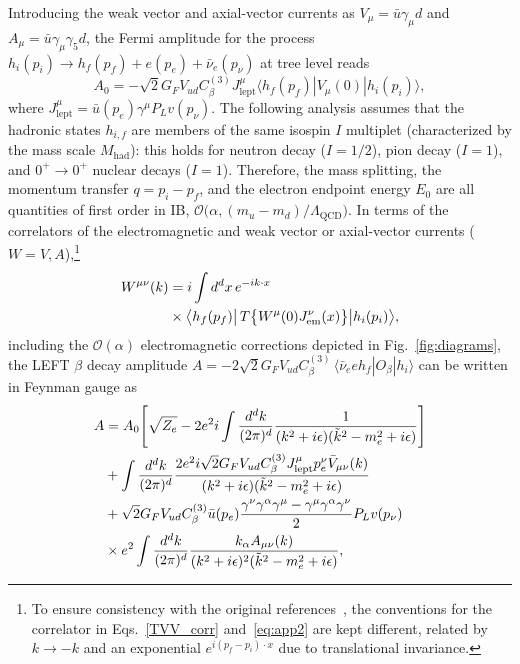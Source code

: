 \documentclass[prl,twocolumn,twoside,preprintnumbers,superscriptaddress,nofootinbib,letterpaper]{revtex4-1}
\newcommand{\Order}{\mathcal{O}}
\newcommand{\beq}{\begin{equation}}
\newcommand{\eeq}{\end{equation}}
\newcommand{\Mhad}{M_\text{had}}
\begin{document}
Introducing the weak vector and axial-vector currents as $V_\mu = \bar u \gamma_\mu d$ and $A_\mu = \bar u \gamma_\mu \gamma_5 d$,
the Fermi  amplitude  for the process
$h_i (p_i ) \to h_f (p_f) + e (p_e) + \bar \nu_e (p_\nu)$
at tree level reads
\beq
A_0 = - \sqrt{2} G_F V_{ud}
C_\beta^{(3)}
J_\text{lept}^\mu  \langle h_f (p_f) | V_\mu (0) | h_i (p_i) \rangle,
\label{eq:app1}
\eeq
where $J_\text{lept}^\mu  =  \bar u(p_e) \gamma^\mu P_L v (p_\nu)$.
The following analysis assumes that the hadronic states $h_{i,f}$ are
 members of the same isospin $I$ multiplet (characterized by the mass scale $\Mhad$):
 this holds for neutron decay ($I=1/2$),  pion decay ($I=1$), and $0^+ \to 0^+$  nuclear decays ($I=1$).
 Therefore,  the mass splitting, the  momentum transfer $q = p_i - p_f$, and
 the electron endpoint energy $E_0$ are all quantities of first order in IB,
 $\Order\big(\alpha, (m_u-m_d)/\Lambda_\text{QCD}\big)$.
In terms of the correlators   of the electromagnetic and weak vector or axial-vector currents ($W=V,A$),\footnote{To ensure consistency with the original references~\cite{Descotes-Genon:2005wrq,Abers:1968zz}, the conventions for the correlator in Eqs.~\eqref{TVV_corr} and~\eqref{eq:app2} are kept different, related by $k\to -k$ and an exponential $e^{i(p_f-p_i)\cdot x}$ due to translational invariance.}
\begin{align}
W^{\mu \nu} (k) &= i \int d^d x  \,  e^{-i k \cdot x} \notag\\  &\times\big\langle h_f (p_f) \big|  \, T  \big\{W^\mu (0) J_\text{em}^\nu (x) \big\}  \big| h_i (p_i) \big\rangle,
\label{eq:app2}
\end{align}
including the $\Order (\alpha)$ electromagnetic corrections depicted in
Fig.~\ref{fig:diagrams},
the LEFT  $\beta$ decay amplitude
$A = - 2  \sqrt{2} G_F V_{ud}
C_\beta^{(3)} \,   \langle \bar \nu_e e  h_f  | O_\beta  | h_i \rangle$
 can be written in Feynman gauge as
 \begin{align}
 A & = A_0 \Bigg[ \sqrt{Z_e}  - 2 e^2  i \int \frac{d^dk}{(2 \pi)^d} \frac{1}{(k^2 + i \epsilon) (\tilde k^2-m_e^2 + i \epsilon)} \Bigg]\notag\\
&+
   \int \frac{d^dk}{(2 \pi)^d} \frac{2e^2i \sqrt{2} G_F V_{ud} C^{(3)}_\beta   J^\mu_\text{lept} p_e^\nu \bar V_{\mu\nu}(k)
 }{ (k^2 + i \epsilon) (\tilde k^2-m_e^2 + i \epsilon)}
 \nonumber \\
 & + \sqrt{2} G_F V_{ud} C^{(3)}_\beta  \bar u(p_e) \frac{ \gamma^\nu \gamma^\alpha \gamma^\mu - \gamma^\mu \gamma^\alpha \gamma^\nu}{2}  P_L  v (p_\nu)\notag\\
&\times
  e^2  \int \frac{d^dk}{(2 \pi)^d} \frac{ k_\alpha  A_{\mu \nu}  (k) }{ (k^2 + i \epsilon)^2 (\tilde k^2-m_e^2 + i \epsilon)},
  \label{eq:app3}
\end{align}
\end{document}
